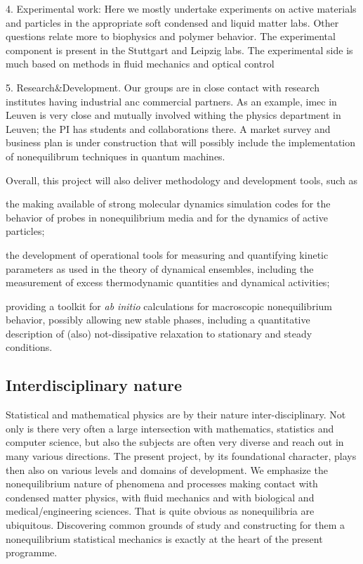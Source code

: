 4. Experimental work: Here we mostly undertake experiments on active materials and particles
in the appropriate soft condensed and liquid matter labs.  Other questions relate more to
biophysics and polymer behavior. The experimental component is present in the Stuttgart and
Leipzig labs.  The experimental side is much based on methods in fluid mechanics and optical control


5. Research\&Development.  Our groups are in close contact with research institutes having industrial anc commercial partners.
As an example, imec in Leuven is very close and mutually involved withing the physics department in Leuven; the PI has students and collaborations there.
A market survey and business plan is under construction that will possibly include the implementation of nonequilibrum techniques in quantum machines.


Overall, this project will also deliver methodology and development tools, such as
\begin{inparaenum}[A.]
	\item the making available of strong molecular dynamics simulation codes for the behavior of
	probes in nonequilibrium media and for the dynamics of active particles;
	\item the development of operational tools for measuring and quantifying kinetic parameters
	as used in the theory of dynamical ensembles, including the measurement of excess
	thermodynamic quantities and dynamical activities;
	\item providing a toolkit for {\it ab initio} calculations for macroscopic nonequilibrium
	behavior, possibly allowing new stable phases, including a quantitative description of
	(also) not-dissipative relaxation to stationary and steady conditions.
\end{inparaenum}


\subsection{Interdisciplinary nature}\label{sec:interdisc}


Statistical and mathematical physics are by their nature inter-disciplinary.  Not
only is there very often a large intersection with mathematics, statistics and computer
science, but also the subjects are often very diverse and reach out in many various
directions.  The present project, by its foundational character, plays then also on various levels and domains of development. We emphasize the nonequilibrium nature of
phenomena and processes making contact with condensed matter physics, with
fluid mechanics and with biological and medical/engineering sciences.  That is quite obvious
as nonequilibria are ubiquitous.  Discovering common grounds of study and constructing for
them a nonequilibrium statistical mechanics is exactly  at the heart of the present programme.

